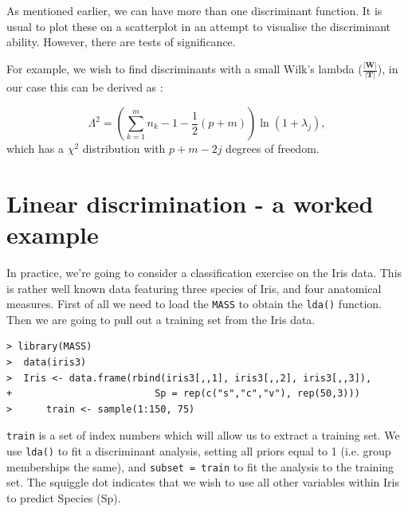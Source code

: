 As mentioned earlier, we can have more than one discriminant function.   It is usual to plot these on a scatterplot in an attempt to visualise the discriminant ability.   However, there are tests of significance.

For example, we wish to find discriminants with a small Wilk's lambda ($\frac{|\boldsymbol{W}|}{|\boldsymbol{T}|}$), in our case this can be derived as :

\begin{equation}
\Lambda^{2} = \left( \sum_{k=1}^{m} n_{k} - 1 - \frac{1}{2}(p + m) \right) \ln (1 + \lambda_{j}),
\end{equation}
which has a $\chi^{2}$ distribution with $p + m - 2j$ degrees of freedom.










\section{Linear discrimination - a worked example}

In practice, we're going to consider a classification exercise on the Iris data.   This is rather well known data featuring three species of Iris, and four anatomical measures.   First of all we need to load the \texttt{MASS} to obtain the \texttt{lda()} function.   Then we are going to pull out a training set from the Iris data.

\singlespacing
\begin{verbatim}
> library(MASS)
>  data(iris3)
>  Iris <- data.frame(rbind(iris3[,,1], iris3[,,2], iris3[,,3]),
+                         Sp = rep(c("s","c","v"), rep(50,3)))
>      train <- sample(1:150, 75)
\end{verbatim}
\onehalfspacing

\texttt{train} is a set of index numbers which will allow us to extract a training set.   We use \texttt{lda()} to fit a discriminant analysis, setting all priors equal to 1 (i.e. group memberships the same), and \texttt{subset = train} to fit the analysis to the training set.   The squiggle dot indicates that we wish to use all other variables within Iris to predict Species (Sp).


